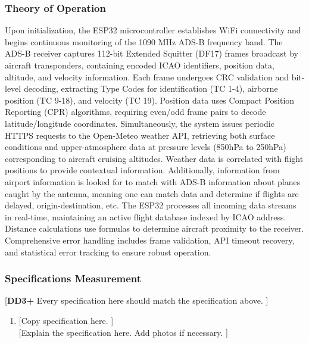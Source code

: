 \subsubsection{Theory of Operation}
Upon initialization, the ESP32 microcontroller establishes WiFi connectivity and begins continuous monitoring of the 1090 MHz ADS-B frequency band. 
The ADS-B receiver captures 112-bit Extended Squitter (DF17) frames broadcast by aircraft transponders, containing encoded ICAO identifiers, position data, altitude, and velocity information. 
Each frame undergoes CRC validation and bit-level decoding, extracting Type Codes for identification (TC 1-4), airborne position (TC 9-18), and velocity (TC 19). 
Position data uses Compact Position Reporting (CPR) algorithms, requiring even/odd frame pairs to decode latitude/longitude coordinates.
\newline
Simultaneously, the system issues periodic HTTPS requests to the Open-Meteo weather API, retrieving both surface conditions and upper-atmosphere data at pressure levels (850hPa to 250hPa) corresponding to aircraft cruising altitudes. 
Weather data is correlated with flight positions to provide contextual information. 
Additionally, information from airport information is looked for to match with ADS-B information about planes caught by the antenna, meaning one can match data and determine if flights are delayed, origin-destination, etc.
\newline
The ESP32 processes all incoming data streams in real-time, maintaining an active flight database indexed by ICAO address. 
Distance calculations use formulas to determine aircraft proximity to the receiver. 
Comprehensive error handling includes frame validation, API timeout recovery, and statistical error tracking to ensure robust operation.


\subsubsection{Specifications Measurement}
[\textbf{DD3+} Every specification here should match the specification above. ]
\begin{enumerate}
    \item {[Copy specification here. ]} \\
          {[Explain the specification here. Add photos if necessary. ]}
\end{enumerate}

